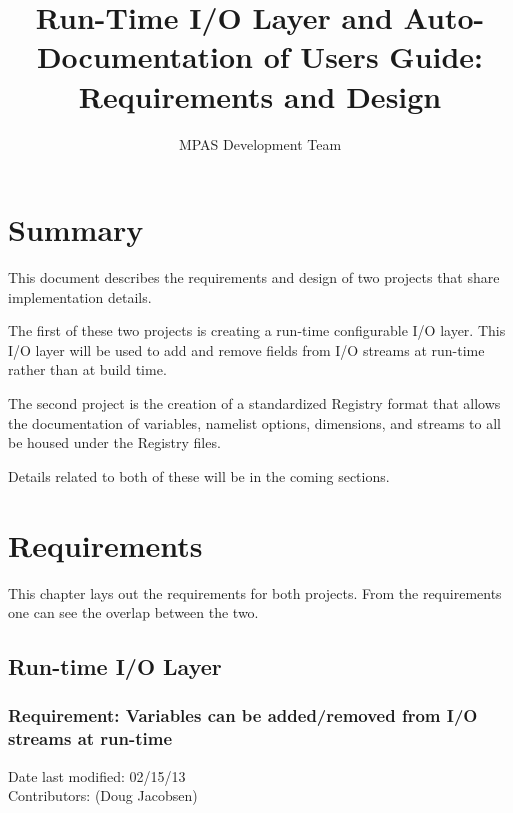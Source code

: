 \documentclass[11pt]{report}
\begin{document}
\title{Run-Time I/O Layer and Auto-Documentation of Users Guide: \\
Requirements and Design}
\author{MPAS Development Team}

\maketitle
\tableofcontents


\chapter{Summary}

This document describes the requirements and design of two projects that share
implementation details.

The first of these two projects is creating a run-time configurable I/O layer.
This I/O layer will be used to add and remove fields from I/O streams at
run-time rather than at build time. 

The second project is the creation of a standardized Registry format that
allows the documentation of variables, namelist options, dimensions, and
streams to all be housed under the Registry files.

Details related to both of these will be in the coming sections.






\chapter{Requirements}

This chapter lays out the requirements for both projects. From the requirements one can see the overlap between the two.

\section{Run-time I/O Layer}
\subsection{Requirement: Variables can be added/removed from I/O streams at run-time}
Date last modified: 02/15/13 \\
Contributors: (Doug Jacobsen) \\
\end{document}
